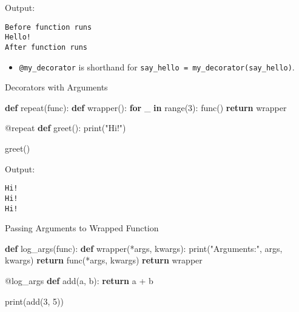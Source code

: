 \documentclass[
  letterpaper,
  DIV=11,
  numbers=noendperiod]{scrreprt}
\newenvironment{Shaded}{\begin{snugshade}}{\end{snugshade}}
\newcommand{\AttributeTok}[1]{\textcolor[rgb]{0.40,0.45,0.13}{#1}}
\newcommand{\BuiltInTok}[1]{\textcolor[rgb]{0.00,0.23,0.31}{#1}}
\newcommand{\ControlFlowTok}[1]{\textcolor[rgb]{0.00,0.23,0.31}{\textbf{#1}}}
\newcommand{\DecValTok}[1]{\textcolor[rgb]{0.68,0.00,0.00}{#1}}
\newcommand{\KeywordTok}[1]{\textcolor[rgb]{0.00,0.23,0.31}{\textbf{#1}}}
\newcommand{\NormalTok}[1]{\textcolor[rgb]{0.00,0.23,0.31}{#1}}
\newcommand{\OperatorTok}[1]{\textcolor[rgb]{0.37,0.37,0.37}{#1}}
\newcommand{\StringTok}[1]{\textcolor[rgb]{0.13,0.47,0.30}{#1}}
\providecommand{\tightlist}{%
  \setlength{\itemsep}{0pt}\setlength{\parskip}{0pt}}
\begin{document}
Output:

\begin{verbatim}
Before function runs
Hello!
After function runs
\end{verbatim}

\begin{itemize}
\tightlist
\item
  \texttt{@my\_decorator} is shorthand for
  \texttt{say\_hello\ =\ my\_decorator(say\_hello)}.
\end{itemize}

Decorators with Arguments

\begin{Shaded}
\begin{Highlighting}[]
\KeywordTok{def}\NormalTok{ repeat(func):}
    \KeywordTok{def}\NormalTok{ wrapper():}
        \ControlFlowTok{for}\NormalTok{ \_ }\KeywordTok{in} \BuiltInTok{range}\NormalTok{(}\DecValTok{3}\NormalTok{):}
\NormalTok{            func()}
    \ControlFlowTok{return}\NormalTok{ wrapper}

\AttributeTok{@repeat}
\KeywordTok{def}\NormalTok{ greet():}
    \BuiltInTok{print}\NormalTok{(}\StringTok{"Hi!"}\NormalTok{)}

\NormalTok{greet()}
\end{Highlighting}
\end{Shaded}

Output:

\begin{verbatim}
Hi!
Hi!
Hi!
\end{verbatim}

Passing Arguments to Wrapped Function

\begin{Shaded}
\begin{Highlighting}[]
\KeywordTok{def}\NormalTok{ log\_args(func):}
    \KeywordTok{def}\NormalTok{ wrapper(}\OperatorTok{*}\NormalTok{args, kwargs):}
        \BuiltInTok{print}\NormalTok{(}\StringTok{"Arguments:"}\NormalTok{, args, kwargs)}
        \ControlFlowTok{return}\NormalTok{ func(}\OperatorTok{*}\NormalTok{args, kwargs)}
    \ControlFlowTok{return}\NormalTok{ wrapper}

\AttributeTok{@log\_args}
\KeywordTok{def}\NormalTok{ add(a, b):}
    \ControlFlowTok{return}\NormalTok{ a }\OperatorTok{+}\NormalTok{ b}

\BuiltInTok{print}\NormalTok{(add(}\DecValTok{3}\NormalTok{, }\DecValTok{5}\NormalTok{))}
\end{Highlighting}
\end{Shaded}
\end{document}
